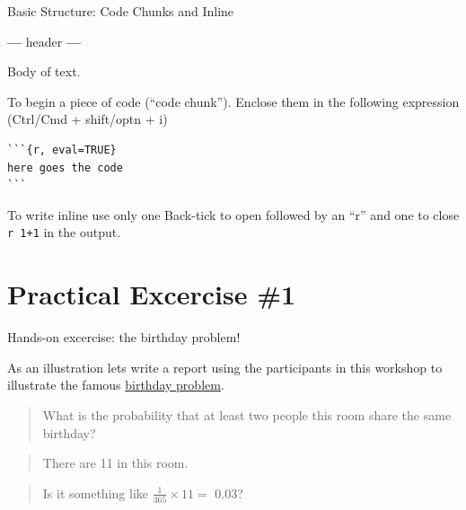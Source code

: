 \documentclass[ignorenonframetext,]{beamer}
\newenvironment{Shaded}{\begin{snugshade}}{\end{snugshade}}
\newcommand{\NormalTok}[1]{#1}
\newcommand{\OperatorTok}[1]{\textcolor[rgb]{0.81,0.36,0.00}{\textbf{#1}}}
\begin{document}
\begin{frame}[fragile]{Basic Structure: Code Chunks and Inline}
\protect\hypertarget{basic-structure-code-chunks-and-inline}{}

\begin{Shaded}
\begin{Highlighting}[]
\OperatorTok{---}
\NormalTok{header}
\OperatorTok{---}
\end{Highlighting}
\end{Shaded}

Body of text.

To begin a piece of code (``code chunk''). Enclose them in the following
expression (Ctrl/Cmd + shift/optn + i)

\begin{verbatim}
```{r, eval=TRUE}
here goes the code
```
\end{verbatim}

To write inline use only one Back-tick to open followed by an ``r'' and
one to close \texttt{\textasciigrave{}r\ 1+1\textasciigrave{}} in the
output.

\end{frame}

\hypertarget{practical-excercise-1}{%
\section{Practical Excercise \#1}\label{practical-excercise-1}}

\begin{frame}{Hands-on excercise: the birthday problem!}
\protect\hypertarget{hands-on-excercise-the-birthday-problem}{}

As an illustration lets write a report using the participants in this
workshop to illustrate the famous
\href{https://en.wikipedia.org/wiki/Birthday_problem}{birthday problem}.

\begin{quote}
What is the probability that at least two people this room share the
same birthday?
\end{quote}

\begin{quote}
There are 11 in this room.
\end{quote}

\begin{quote}
Is it something like \(\frac{1}{365} \times 11=\) 0.03?
\end{quote}

\end{frame}
\end{document}
